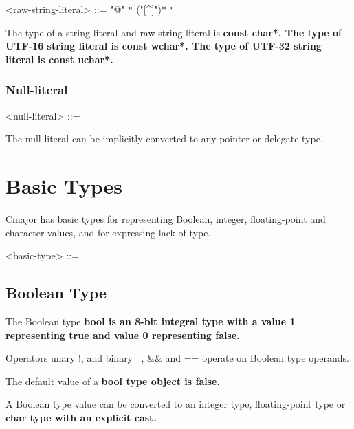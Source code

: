 \documentclass[a4paper,oneside,11pt]{article}
\begin{document}
\begin{grammar}
\label{raw-string-literal}<raw-string-literal> ::= "@" \verb|"| ("[^\"]")* \verb|"|
\end{grammar}

The type of a string literal and raw string literal is \bf{const char*}.
The type of UTF-16 string literal is \bf{const wchar*}.
The type of UTF-32 string literal is \bf{const uchar*}.

\subsubsection{Null-literal}

\begin{grammar}
\label{null-literal}<null-literal> ::= 
\end{grammar}

The null literal can be implicitly converted to any pointer or delegate type.

\section{Basic Types}\label{sec:basictypes}

Cmajor has basic types for representing Boolean, integer, floating-point and character values,
and for expressing lack of type.

\begin{grammar}
\label{basic-type}<basic-type> ::= 
\alt {}
\alt {}
\alt {}
\alt {}
\alt {}
\alt {}
\alt {}
\alt {}
\alt {}
\alt {}
\alt {}
\alt {}
\alt {}
\alt {}
\end{grammar}

\subsection{Boolean Type}

The Boolean type \bf{bool} is an 8-bit integral type with a value 1 representing \bf{true} and value 0 representing \bf{false}.

Operators unary !, and binary $||$, \&\& and == operate on Boolean type operands.

The default value of a \bf{bool} type object is \bf{false}.

A Boolean type value can be converted to an integer type, floating-point type or \bf{char} type with an explicit \bf{cast}.
\end{document}
